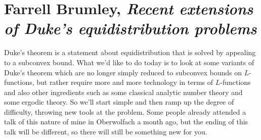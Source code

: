 \documentclass[reqno]{amsart} 
\begin{document}
\section{Farrell Brumley, \emph{Recent extensions of Duke's equidistribution problems}}
Duke's theorem is a statement about equidistribution that is solved by appealing to a subconvex bound.  What we'd like to do today is to look at some variants of Duke's theorem which are no longer simply reduced to subconvex bounds on $L$-functions, but rather require more and more technology in terms of $L$-functions and also other ingredients such as some classical analytic number theory and some ergodic theory.  So we'll start simple and then ramp up the degree of difficulty, throwing new tools at the problem.  Some people already attended a talk of this nature of mine in Oberwolfach a month ago, but the ending of this talk will be different, so there will still be something new for you.
\end{document}
